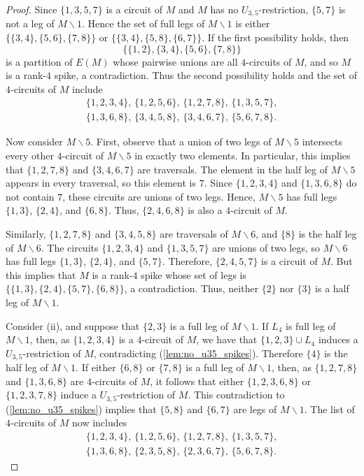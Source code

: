 \documentclass[11pt]{amsart}
\numberwithin{equation}{section} %
\begin{document}
\begin{proof}
Since $\{1, 3, 5, 7\}$ is a circuit of $M$ and $M$ has no $U_{3, 5}$-restriction, $\{5,7\}$ is not a leg of $M\backslash 1$. Hence the set of full legs of $M\backslash 1$ is either $\{\{3, 4\}, \{5, 6\}, \{7, 8\}\}$ or $\{\{3, 4\}, \{5, 8\}, \{6, 7\}\}$. If the first possibility holds, then
$$\{\{1, 2\}, \{3, 4\}, \{5, 6\}, \{7, 8\}\}$$
is a partition of $E(M)$ whose pairwise unions are all $4$-circuits of $M$, and so $M$ is a rank-$4$ spike, a contradiction. Thus the second possibility holds and the set of $4$-circuits of $M$ include
\begin{align*}
\{1, 2, 3, 4\},\, \{1, 2, 5, 6\},\, \{1, 2, 7, 8\},\, \{1, 3, 5, 7\}, \\
\{1, 3, 6, 8\},\, \{3, 4, 5, 8\},\, \{3, 4, 6, 7\},\, \{5, 6, 7, 8\}.
\end{align*}

Now consider $M\backslash 5$. First, observe that a union of two legs of $M \backslash 5$ intersects every other $4$-circuit of $M \backslash 5$ in exactly two elements. In particular, this implies that $\{1,2,7,8\}$ and $\{3,4,6,7\}$ are traversals. The element in the half leg of $M \backslash 5$ appears in every traversal, so this element is $7$. Since $\{1,2,3,4\}$ and $\{1,3,6,8\}$ do not contain $7$, these circuits are unions of two legs. Hence, $M \backslash 5$ has full legs $\{1,3\}$, $\{2,4\}$, and $\{6,8\}$. Thus, $\{2,4,6,8\}$ is also a $4$-circuit of $M$.

Similarly, $\{1,2,7,8\}$ and $\{3,4,5,8\}$ are traversals of $M \backslash 6$, and $\{8\}$ is the half leg of $M \backslash 6$. The circuits $\{1,2,3,4\}$ and $\{1,3,5,7\}$ are unions of two legs, so $M \backslash 6$ has full legs $\{1,3\}$, $\{2,4\}$, and $\{5,7\}$. Therefore, $\{2,4,5,7\}$ is a circuit of $M$. But this implies that $M$ is a rank-$4$ spike whose set of legs is $\{\{1,3\},\{2,4\},\{5,7\},\{6,8\}\}$, a contradiction. Thus, neither $\{2\}$ nor $\{3\}$ is a half leg of $M \backslash 1$.

Consider (ii), and suppose that $\{2, 3\}$ is a full leg of $M\backslash 1$. If $L_4$ is full leg of $M\backslash 1$, then, as $\{1, 2, 3, 4\}$ is a $4$-circuit of $M$, we have that $\{1, 2, 3\}\cup L_4$ induces a $U_{3, 5}$-restriction of $M$, contradicting (\ref{lem:no_u35_spikes}). Therefore $\{4\}$ is the half leg of $M\backslash 1$. If either $\{6, 8\}$ or $\{7, 8\}$ is a full leg of $M\backslash 1$, then, as $\{1, 2, 7, 8\}$ and $\{1, 3, 6, 8\}$ are $4$-circuits of $M$, it follows that either $\{1, 2, 3, 6, 8\}$ or $\{1, 2, 3, 7, 8\}$ induce a $U_{3,5}$-restriction of $M$. This contradiction to (\ref{lem:no_u35_spikes}) implies that $\{5, 8\}$ and $\{6, 7\}$ are legs of $M\backslash 1$. The list of $4$-circuits of $M$ now includes
\begin{align*}
\{1, 2, 3, 4\},\, \{1, 2, 5, 6\},\, \{1, 2, 7, 8\},\, \{1,3,5,7\},\\
\{1, 3, 6, 8\},\, \{2, 3, 5, 8\},\, \{2, 3, 6, 7\},\, \{5, 6, 7, 8\}.
\end{align*}


\end{proof}
\end{document}
